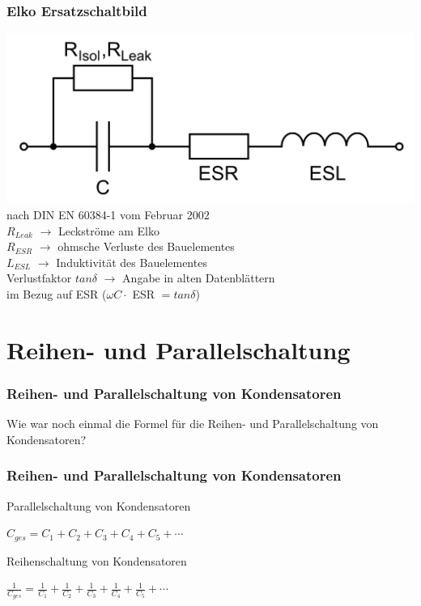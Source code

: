 \begin{frame}
\frametitle{Elko Ersatzschaltbild}
\begin{center}
		\includegraphics[width=.8\textwidth,height=.4\textheight,keepaspectratio]{a03/Elko-Ersatzschaltbild.png}
		{\tiny\hyperlink{refs}{\cite{wc}}\\
		nach DIN EN 60384-1 vom Februar 2002} \\[1em]

        $R_{Leak}$ $\rightarrow$ Leckströme am Elko\\
        $R_{ESR}$ $\rightarrow$ ohmsche Verluste des Bauelementes\\
        $L_{ESL}$ $\rightarrow$ Induktivität des Bauelementes\\
        Verlustfaktor $tan \delta$ $\rightarrow$ Angabe in alten Datenblättern \\im Bezug auf ESR ($\omega C \cdot$ ESR $= tan \delta$)
\end{center}
\end{frame}
	

\section*{Reihen- und Parallelschaltung}

\begin{frame}
  \frametitle{Reihen- und Parallelschaltung von Kondensatoren}
  \begin{center}
    \huge Wie war noch einmal die Formel für die Reihen- und Parallelschaltung von Kondensatoren?
  \end{center}
\end{frame}
 
\begin{frame}
  \frametitle{Reihen- und Parallelschaltung von Kondensatoren}	
  \begin{block}{Parallelschaltung von Kondensatoren}
    \begin{center}
      \huge{$C_{ges} = C_{1} + C_{2} + C_{3} + C_{4} + C_{5} + \cdots$} 
    \end{center}
  \end{block}
  \pause
  \begin{block}{Reihenschaltung von Kondensatoren}
    \begin{center}
      \huge{$\frac{1}{C_{ges}} = \frac{1}{ C_{1}} + \frac{1}{C_{2}} + \frac{1}{C_{3}} + \frac{1}{C_{4}} + \frac{1}{C_{5}} + \cdots$}
    \end{center}
  \end{block}
\end{frame}
    
